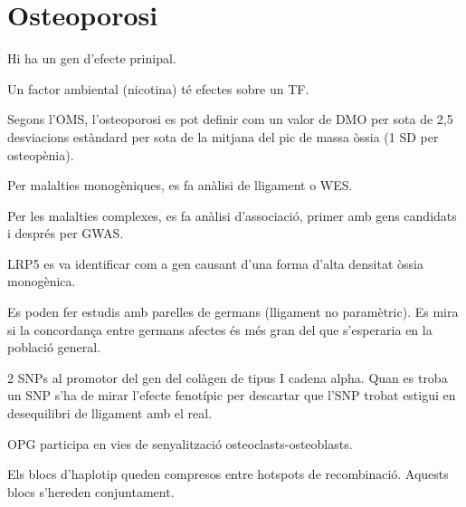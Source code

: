 
\section{Osteoporosi}
\label{sec:osteoporosi}

Hi ha un gen d'efecte prinipal.

Un factor ambiental (nicotina) té efectes sobre un TF.

Segons l'OMS, l'osteoporosi es pot definir com un valor de DMO per
sota de 2,5 desviacions estàndard per sota de la mitjana del pic de
massa òssia (1 SD per osteopènia).

Per malalties monogèniques, es fa anàlisi de lligament o WES.

Per les malalties complexes, es fa anàlisi d'associació, primer amb
gens candidats i després per GWAS.

LRP5 es va identificar com a gen causant d'una forma d'alta densitat
òssia monogènica. 

Es poden fer estudis amb parelles de germans (lligament no
paramètric). Es mira si la concordança entre germans afectes és més
gran del que s'esperaria en la població general.

2 SNPs al promotor del gen del colàgen de tipus I cadena alpha. Quan
es troba un SNP s'ha de mirar l'efecte fenotípic per descartar que
l'SNP trobat estigui en desequilibri de lligament amb el real.

OPG participa en vies de senyalització osteoclasts-osteoblasts.

Els blocs d'haplotip queden compresos entre hotspots de
recombinació. Aquests blocs s'hereden conjuntament.